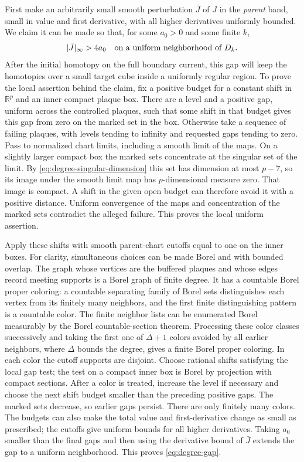 First make an arbitrarily small smooth perturbation $\bar J$ of $J$ in
the \emph{parent} band, small in value and first derivative, with all
higher derivatives uniformly bounded.  We claim it can be made so that,
for some $a_0>0$ and some finite $k$,
\begin{equation}\label{eq:degree-gap}
                |\bar J|_\infty>4a_0
             \quad\hbox{on a uniform neighborhood of }D_k.
\end{equation}
After the initial homotopy on the full boundary current, this gap will
keep the homotopies over a small target cube inside a uniformly regular
region.
To prove the local assertion behind the claim, fix a positive budget for
a constant shift in $\mathbb R^p$ and an inner compact plaque box.
There are a level and a positive gap, uniform across the controlled
plaques, such that some shift in that budget gives this gap from zero on
the marked set in the box.  Otherwise take a sequence of failing plaques,
with levels tending to infinity and requested gaps tending to zero.
Pass to normalized chart limits, including a smooth limit of the maps.
On a slightly larger compact box the marked sets concentrate at the
singular set of the limit.  By \eqref{eq:degree-singular-dimension} this
set has dimension at most $p-7$, so its image under the smooth limit map
has $p$-dimensional measure zero.  That image is compact.  A shift in the
given open budget can therefore avoid it with a positive distance.
Uniform convergence of the maps and concentration of the marked sets
contradict the alleged failure.  This proves the local uniform assertion.

Apply these shifts with smooth parent-chart cutoffs equal to one on the
inner boxes.  For clarity, simultaneous choices can be made Borel and
with bounded overlap.  The graph whose vertices are the buffered plaques
and whose edges record meeting supports is a Borel graph of finite
degree.  It has a countable Borel proper coloring: a countable separating
family of Borel sets distinguishes each vertex from its finitely many
neighbors, and the first finite distinguishing pattern is a countable
color.  The finite neighbor lists can be enumerated Borel measurably by
the Borel countable-section theorem.  Processing these color classes
successively and taking the first one of $\Delta+1$ colors avoided by
all earlier neighbors, where $\Delta$ bounds the degree,
gives a finite Borel proper coloring.  In each color the cutoff supports
are disjoint.  Choose rational shifts satisfying the local gap test; the
test on a compact inner box is Borel by projection with compact sections.
After a color is treated, increase the level if necessary and choose the
next shift budget smaller than the preceding positive gaps.  The marked
sets decrease, so earlier gaps persist.  There are only finitely many
colors.  The budgets can also make the total value and first-derivative
change as small as prescribed; the cutoffs give uniform bounds for all
higher derivatives.  Taking $a_0$ smaller than the final gaps and then
using the derivative bound of $\bar J$ extends the gap to a uniform
neighborhood.  This proves \eqref{eq:degree-gap}.

